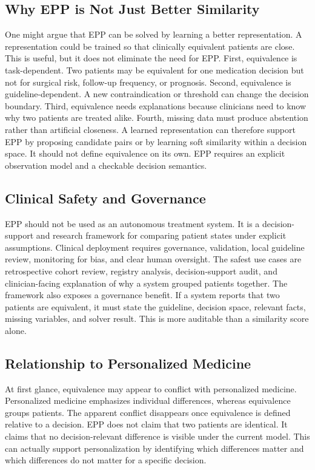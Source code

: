 \documentclass[english,5p,twocolumn,preprint]{elsarticle}
\begin{document}
\subsection{Why EPP is Not Just Better Similarity}
One might argue that EPP can be solved by learning a better representation. A representation could be trained so that clinically equivalent patients are close. This is useful, but it does not eliminate the need for EPP. First, equivalence is task-dependent. Two patients may be equivalent for one medication decision but not for surgical risk, follow-up frequency, or prognosis. Second, equivalence is guideline-dependent. A new contraindication or threshold can change the decision boundary. Third, equivalence needs explanations because clinicians need to know why two patients are treated alike. Fourth, missing data must produce abstention rather than artificial closeness. A learned representation can therefore support EPP by proposing candidate pairs or by learning soft similarity within a decision space. It should not define equivalence on its own. EPP requires an explicit observation model and a checkable decision semantics.

\subsection{Clinical Safety and Governance}
EPP should not be used as an autonomous treatment system. It is a decision-support and research framework for comparing patient states under explicit assumptions. Clinical deployment requires governance, validation, local guideline review, monitoring for bias, and clear human oversight. The safest use cases are retrospective cohort review, registry analysis, decision-support audit, and clinician-facing explanation of why a system grouped patients together. The framework also exposes a governance benefit. If a system reports that two patients are equivalent, it must state the guideline, decision space, relevant facts, missing variables, and solver result. This is more auditable than a similarity score alone.

\subsection{Relationship to Personalized Medicine}
At first glance, equivalence may appear to conflict with personalized medicine. Personalized medicine emphasizes individual differences, whereas equivalence groups patients. The apparent conflict disappears once equivalence is defined relative to a decision. EPP does not claim that two patients are identical. It claims that no decision-relevant difference is visible under the current model. This can actually support personalization by identifying which differences matter and which differences do not matter for a specific decision.
\end{document}
